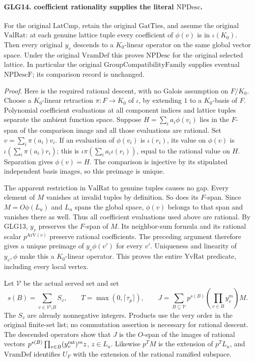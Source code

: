 \documentclass[11pt,a4paper]{article}
\numberwithin{equation}{section}
\theoremstyle{remark}\newtheorem{remark}[theorem]{Remark}
\begin{document}
\paragraph{GLG14. coefficient rationality supplies the literal \(\mathrm{NPDesc}\).}
\label{claim:GLG14}
For the original \(\mathrm{LatCmp}\), retain the original
\(\mathrm{GatTies}\), and assume the original
\(\mathrm{ValRat}\): at each genuine lattice tuple every
coefficient of \(\phi(v)\) is in \(\iota(K_0)\).
Then every original \(y_v\) descends to a \(K_0\)-linear
operator on the same global vector space. Under the
original \(\mathrm{VramDef}\) this proves
\(\mathrm{NPDesc}\) for the original selected lattice.
In particular the original
\(\mathrm{GroupCompatibilityFamily}\) supplies eventual
\(\mathrm{NPDescF}\); its comparison record is unchanged.

\emph{Proof.}
Here is the required rational descent, with no Galois
assumption on \(F/K_0\). Choose a \(K_0\)-linear retraction
\(\pi:F\to K_0\) of \(\iota\), by extending \(1\) to a
\(K_0\)-basis of \(F\). Polynomial coefficient evaluations
at all component indices and lattice tuples separate
the ambient function space. Suppose
\(H=\sum_i a_i\phi(v_i)\) lies in the \(F\)-span of the
comparison image and all those evaluations are rational.
Set \(v=\sum_i\pi(a_i)v_i\). If an evaluation of
\(\phi(v_i)\) is \(\iota(r_i)\), its value on \(\phi(v)\)
is \(\iota(\sum_i\pi(a_i)r_i)\); this is
\(\iota\pi(\sum_i a_i\iota(r_i))\), equal to the
rational value on \(H\). Separation gives \(\phi(v)=H\).
The comparison is injective by its stipulated independent
basis images, so this preimage is unique.

The apparent restriction in \(\mathrm{ValRat}\) to genuine
tuples causes no gap. Every element of \(M\) vanishes
at invalid tuples by definition. So does its \(F\)-span.
Since \(M=O\phi(L_u)\) and \(L_u\) spans the global space,
\(\phi(v)\) belongs to that span and vanishes there as well.
Thus all coefficient evaluations used above are rational.
By GLG13, \(y_v\) preserves the \(F\)-span of \(M\).
Its neighbor-sum formula and its rational scalar
\(p^{\mathrm{ArV}(v)}\) preserve rational coefficients.
The preceding argument therefore gives a unique preimage
of \(y_v\phi(v')\) for every \(v'\). Uniqueness and
linearity of \(y_v,\phi\) make this a \(K_0\)-linear
operator. This proves the entire \(\mathrm{YvRat}\)
predicate, including every local vertex.

Let \(\mathcal V\) be the actual served set and set
\[
 s(B)=\sum_{v\in\mathcal V\setminus B}S_v,\qquad
 T=\max(0,\lceil\tau_p\rceil),\qquad
 J=\sum_{B\subseteq\mathcal V}
           p^{s(B)}\left(\prod_{v\in B}y_v^m\right)M .            \tag{GLG.42}
\]
The \(S_v\) are already nonnegative integers. Products
use the very order in the original finite-set list; no
commutation assertion is necessary for rational descent.
The descended operators show that \(J\) is the
\(O\)-span of the images of rational vectors
\(p^{s(B)}\prod_{v\in B}(y_v^{\rm rat})^m z\), \(z\in L_u\).
Likewise \(p^TM\) is the extension of \(p^TL_u\), and
\(\mathrm{VramDef}\) identifies \(U_F\) with the extension
of the rational ramified subspace.
\end{document}
